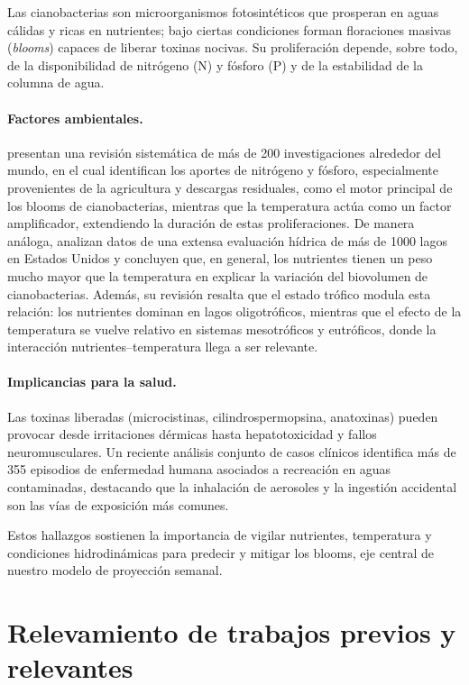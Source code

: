 \documentclass[11pt]{report}
\begin{document}
Las cianobacterias son microorganismos fotosintéticos que prosperan en
aguas cálidas y ricas en nutrientes; bajo ciertas condiciones forman
floraciones masivas (\textit{blooms}) capaces de liberar toxinas
nocivas.  Su proliferación depende, sobre todo, de la disponibilidad de
nitrógeno (N) y fósforo (P) y de la estabilidad de la columna de agua.

\paragraph{Factores ambientales.}  
\citep{Igwaran2024} presentan una revisión sistemática de más de 200 investigaciones alrededor del mundo, en el cual identifican los aportes de nitrógeno y fósforo, especialmente provenientes de la agricultura y descargas residuales, como el motor principal de los blooms de cianobacterias, mientras que la temperatura actúa como un factor amplificador, extendiendo la duración de estas proliferaciones.  
De manera análoga,  \citep{Rigosi2014} analizan datos de una extensa evaluación hídrica de más de 1000 lagos en Estados Unidos y concluyen que, en general, los nutrientes tienen un peso mucho mayor que la temperatura en explicar la variación del biovolumen de cianobacterias. Además, su revisión resalta que el estado trófico modula esta relación: los nutrientes dominan en lagos oligotróficos, mientras que el efecto de la temperatura se vuelve relativo en sistemas mesotróficos y eutróficos, donde la interacción nutrientes–temperatura llega a ser relevante.

\paragraph{Implicancias para la salud.}
Las toxinas liberadas (microcistinas, cilindrospermopsina, anatoxinas)
pueden provocar desde irritaciones dérmicas hasta hepatotoxicidad y
fallos neuromusculares.  Un reciente análisis conjunto de casos clínicos
\citep{Backer2024} identifica más de 355 episodios de enfermedad
humana asociados a recreación en aguas contaminadas, destacando que la
inhalación de aerosoles y la ingestión accidental son las vías de
exposición más comunes.

Estos hallazgos sostienen la importancia de vigilar nutrientes,
temperatura y condiciones hidrodinámicas para predecir y mitigar los
blooms, eje central de nuestro modelo de proyección semanal.

\section{Relevamiento de trabajos previos y relevantes}
\end{document}
